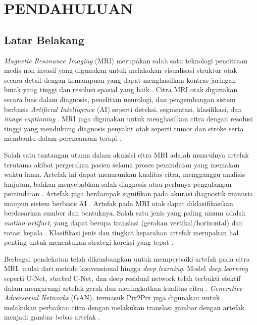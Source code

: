 \chapter{PENDAHULUAN}


\section{Latar Belakang}

\textit{Magnetic Resonance Imaging} (MRI) merupakan salah satu teknologi pencitraan medis non invasif yang digunakan untuk melakukan visualisasi struktur otak secara detail dengan kemampuan yang dapat menghasilkan kontras jaringan lunak yang tinggi dan resolusi spasial yang baik \citep{Safari2024}. Citra MRI otak digunakan secara luas dalam diagnosis, penelitian neurologi, dan pengembangan sistem berbasis \textit{Artificial Intelligence} (AI) seperti deteksi, segmentasi, klasifikasi, dan \textit{image captioning} \citep{Liu2018}. MRI juga digunakan untuk menghasilkan citra dengan resolusi tinggi yang mendukung diagnosis penyakit otak seperti tumor dan stroke serta membantu dalam perencanaan terapi \citep{Zhuge2017,Assam2021}. 

Salah satu tantangan utama dalam akuisisi citra MRI adalah munculnya artefak terutama akibat pergerakan pasien selama proses pemindaian yang memakan waktu lama. Artefak ini dapat menurunkan kualitas citra, mengganggu analisis lanjutan, bahkan menyebabkan salah diagnosis atau perlunya pengulangan pemindaian \citep{Safari2024}. Artefak juga berdampak signifikan pada akurasi diagnostik manusia maupun sistem berbasis AI \citep{Krag2025}. Artefak pada MRI otak dapat diklasifikasikan berdasarkan sumber dan bentuknya. Salah satu jenis yang paling umum adalah \textit{motion artifact}, yang dapat berupa translasi (gerakan vertikal/horizontal) dan rotasi kepala \citep{Vakli2023, Roecher2024}. Klasifikasi jenis dan tingkat keparahan artefak merupakan hal penting untuk menentukan strategi koreksi yang tepat \citep{Jimeno2024}.
 
Berbagai pendekatan telah dikembangkan untuk memperbaiki artefak pada citra MRI, mulai dari metode konvensional hingga \textit{deep learning}. Model \textit{deep learning} seperti U-Net, \textit{stacked} U-Net, dan deep residual network telah terbukti efektif dalam mengurangi artefak gerak dan meningkatkan kualitas citra \citep{Al-masni2022, Sommer2020}. \textit{Generative Adversarial Networks} (GAN), termasuk Pix2Pix juga digunakan untuk melakukan perbaikan citra dengan melakukan translasi gambar dengan artefak menjadi gambar bebas artefak \citep{Safari2024}. 
 
